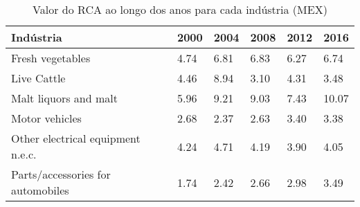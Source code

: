 \begin{table}
\centering
\caption{Valor do RCA ao longo dos anos para cada indústria (MEX)}
\begin{tabular}{p{6cm}p{1.5cm}p{1.5cm}p{1.5cm}p{1.5cm}p{1.5cm}}
\toprule
                        Indústria & 2000 & 2004 & 2008 & 2012 &  2016 \\
\midrule
                 Fresh vegetables & 4.74 & 6.81 & 6.83 & 6.27 &  6.74 \\
                      Live Cattle & 4.46 & 8.94 & 3.10 & 4.31 &  3.48 \\
            Malt liquors and malt & 5.96 & 9.21 & 9.03 & 7.43 & 10.07 \\
                   Motor vehicles & 2.68 & 2.37 & 2.63 & 3.40 &  3.38 \\
Other electrical equipment n.e.c. & 4.24 & 4.71 & 4.19 & 3.90 &  4.05 \\
Parts/accessories for automobiles & 1.74 & 2.42 & 2.66 & 2.98 &  3.49 \\
\bottomrule
\end{tabular}
\end{table}
